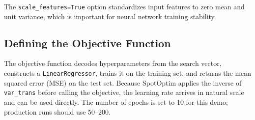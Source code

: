 \documentclass[
  twocolumn]{article}
\begin{document}
The \texttt{scale\_features=True} option standardizes input features to
zero mean and unit variance, which is important for neural network
training stability.

\subsection{Defining the Objective
Function}\label{defining-the-objective-function}

The objective function decodes hyperparameters from the search vector,
constructs a \texttt{LinearRegressor}, trains it on the training set,
and returns the mean squared error (MSE) on the test set. Because
SpotOptim applies the inverse of \texttt{var\_trans} before calling the
objective, the learning rate arrives in natural scale and can be used
directly. The number of epochs is set to 10 for this demo; production
runs should use 50--200.
\end{document}

